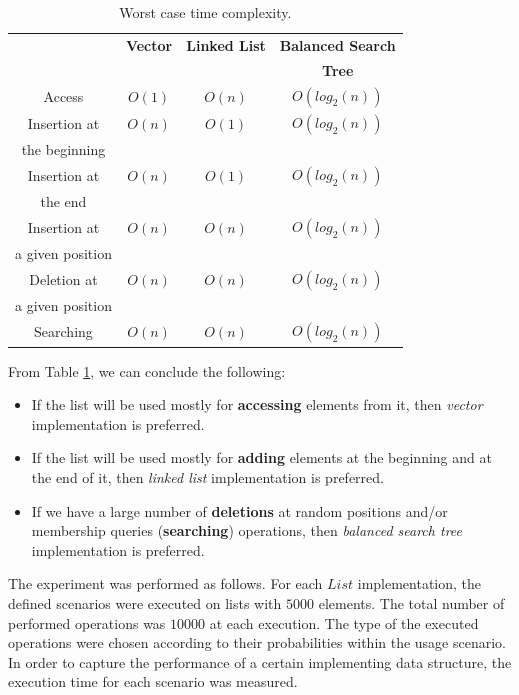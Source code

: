 \begin{table}
\centering
\begin{tabular}{|c|c|c|c|}
\hline
&\textbf{Vector}&\textbf{Linked List}&\textbf{Balanced Search}\\
&&&\textbf{Tree}\\
\hline
Access&$O(1)$&$O(n)$& $O(log_2(n))$\\
Insertion at&$O(n)$& $O(1)$ & $O(log_2(n))$\\
the beginning&&&\\
Insertion at&$O(n)$& $O(1)$ & $O(log_2(n))$\\
the end&&&\\
Insertion at& $O(n)$& $O(n)$ & $O(log_2(n))$\\
a given position&&&\\
Deletion at&$O(n)$& $O(n)$ & $O(log_2(n))$\\
a given position&&&\\
Searching&$O(n)$& $O(n)$ & $O(log_2(n))$\\
\hline
\end{tabular}
\caption{Worst case time complexity.}
\label{tab:list1}
\end{table}

From Table \ref{tab:list1}, we can conclude the following:

\begin{itemize}

\item If the list will be used mostly for \textbf{accessing} elements from it, then \emph{vector} implementation is preferred.

\item If the list will be used mostly for \textbf{adding} elements at the beginning and at the end of it, then \emph{linked list} implementation is preferred.

\item If we have a large number of \textbf{deletions} at random positions and/or membership queries (\textbf{searching}) operations, then  \emph{balanced search tree} implementation is preferred.

\end{itemize}

The experiment was performed as follows. For each $List$ implementation, the defined scenarios were executed on lists with $5000$ elements. The total number of performed operations was $10000$ at each execution. The type of the executed operations were chosen according to their probabilities within the usage scenario. In order to capture the performance of a certain implementing data structure, the execution time for each scenario was measured.

